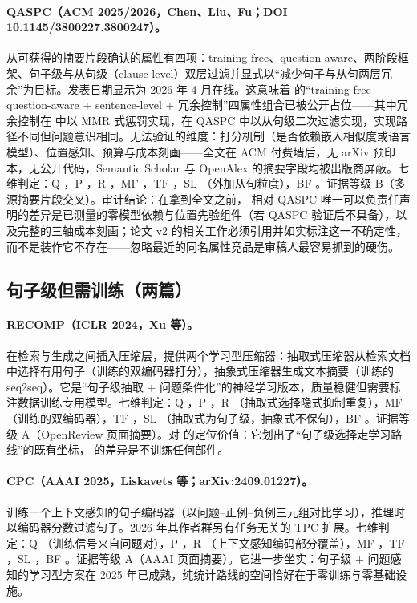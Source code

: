 \paragraph{QASPC（ACM 2025/2026，Chen、Liu、Fu；DOI 10.1145/3800227.3800247）。}
从可获得的摘要片段确认的属性有四项：training-free、question-aware、两阶段框架、句子级与从句级（clause-level）双层过滤并显式以``减少句子与从句两层冗余''为目标。发表日期显示为 2026 年 4 月在线。这意味着 \sieve{} 的``training-free + question-aware + sentence-level + 冗余控制''四属性组合已被公开占位——其中冗余控制在 \sieve{} 中以 MMR 式惩罚实现，在 QASPC 中以从句级二次过滤实现，实现路径不同但问题意识相同。无法验证的维度：打分机制（是否依赖嵌入相似度或语言模型）、位置感知、预算与成本刻画——全文在 ACM 付费墙后，无 arXiv 预印本，无公开代码，Semantic Scholar 与 OpenAlex 的摘要字段均被出版商屏蔽。七维判定：Q \ck{}，P \unk{}，R \ck{}，MF \unk{}，TF \ck{}，SL \ck{}（外加从句粒度），BF \unk{}。证据等级 B（多源摘要片段交叉）。审计结论：在拿到全文之前，\sieve{} 相对 QASPC 唯一可以负责任声明的差异是已测量的零模型依赖与位置先验组件（若 QASPC 验证后不具备），以及完整的三轴成本刻画；论文 v2 的相关工作必须引用并如实标注这一不确定性，而不是装作它不存在——忽略最近的同名属性竞品是审稿人最容易抓到的硬伤。

\subsection{句子级但需训练（两篇）}

\paragraph{RECOMP（ICLR 2024，Xu 等）。}
在检索与生成之间插入压缩层，提供两个学习型压缩器：抽取式压缩器从检索文档中选择有用句子（训练的双编码器打分），抽象式压缩器生成文本摘要（训练的 seq2seq）。它是``句子级抽取 + 问题条件化''的神经学习版本，质量稳健但需要标注数据训练专用模型。七维判定：Q \ck{}，P \no{}，R \no{}（抽取式选择隐式抑制重复），MF \no{}（训练的双编码器），TF \no{}，SL \partl{}（抽取式为句子级，抽象式不保句），BF \no{}。证据等级 A（OpenReview 页面摘要）。对 \sieve{} 的定位价值：它划出了``句子级选择走学习路线''的既有坐标，\sieve{} 的差异是不训练任何部件。

\paragraph{CPC（AAAI 2025，Liskavets 等；arXiv:2409.01227）。}
训练一个上下文感知的句子编码器（以问题--正例--负例三元组对比学习），推理时以编码器分数过滤句子。2026 年其作者群另有任务无关的 TPC 扩展。七维判定：Q \ck{}（训练信号来自问题对），P \no{}，R \partl{}（上下文感知编码部分覆盖），MF \no{}，TF \no{}，SL \ck{}，BF \no{}。证据等级 A（AAAI 页面摘要）。它进一步坐实：句子级 + 问题感知的学习型方案在 2025 年已成熟，纯统计路线的空间恰好在于零训练与零基础设施。

